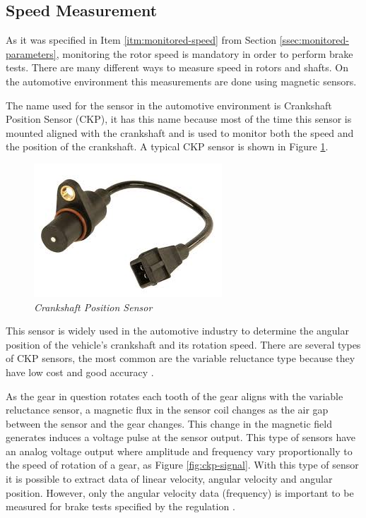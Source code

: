 \subsection{Speed Measurement}\label{ssec:speedMeasurement}
	
	As it was specified in Item \ref{itm:monitored-speed} from Section \ref{ssec:monitored-parameters}, monitoring the rotor speed is mandatory in order to perform brake tests. There are many different ways to measure speed in rotors and shafts. On the automotive environment this measurements are done using magnetic sensors.
	\par
	The name used for the sensor in the automotive environment is Crankshaft Position Sensor (CKP), it has this name because most of the time this sensor is mounted aligned with the crankshaft and is used to monitor both the speed and the position of the crankshaft. A typical CKP sensor is shown in Figure \ref{fig-ckpReal}.

	\begin{figure}[htbp]
		\centering
		\includegraphics[width=.5\textwidth]{figuras/fig-ckp-real.jpg}
		\caption{\textit{Crankshaft Position Sensor} \cite{ckp-gm}}
		\label{fig-ckpReal}
	\end{figure}

	This sensor is widely used in the automotive industry to determine the angular position of the vehicle's crankshaft and its rotation speed. There are several types of CKP sensors, the most common are the variable reluctance type because they have low cost and good accuracy \cite{schroeder2002crankshaft}.
	\par
	As the gear in question rotates each tooth of the gear aligns with the variable reluctance sensor, a magnetic flux in the sensor coil changes as the air gap between the sensor and the gear changes. This change in the magnetic field generates induces a voltage pulse at the sensor output. This type of sensors have an analog voltage output where amplitude and frequency vary proportionally to the speed of rotation of a gear, as Figure \ref{fig:ckp-signal}. With this type of sensor it is possible to extract data of linear velocity, angular velocity and angular position. However, only the angular velocity data (frequency) is important to be measured for brake tests specified by the regulation \cite{saej2522}. 

